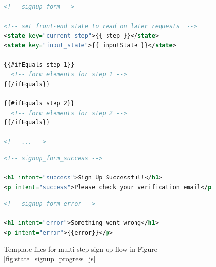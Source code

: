 \begin{figure}
\begin{minipage}{\linewidth}
\begin{lstlisting}[language=xml]
<!-- signup_form -->

<!-- set front-end state to read on later requests  -->
<state key="current_step">{{ step }}</state>
<state key="input_state">{{ inputState }}</state>

{{#ifEquals step 1}}
  <!-- form elements for step 1 -->
{{/ifEquals}}

{{#ifEquals step 2}}
  <!-- form elements for step 2 -->
{{/ifEquals}}

<!-- ... -->
\end{lstlisting}

\begin{lstlisting}[language=xml]
<!-- signup_form_success -->

<h1 intent="success">Sign Up Successful!</h1>
<p intent="success">Please check your verification email</p>
\end{lstlisting}

\begin{lstlisting}[language=xml]
<!-- signup_form_error -->

<h1 intent="error">Something went wrong</h1>
<p intent="error">{{error}}</p>
\end{lstlisting}

\end{minipage}
\caption{Template files for multi-step sign up flow in Figure \ref{fig:state_signup_progress_js}}%
\label{fig:state_signup_progress_xml}%
\end{figure}


